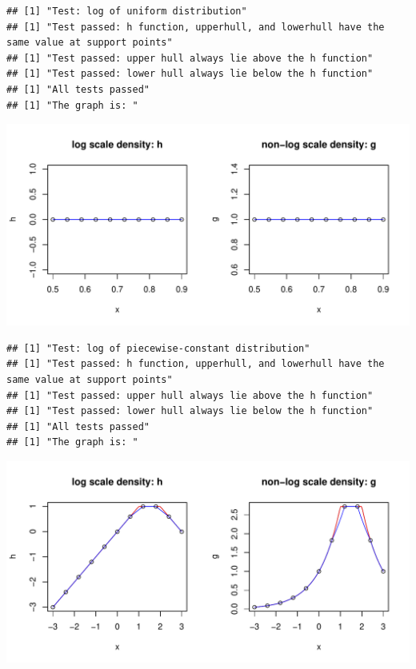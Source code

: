 \documentclass{article}\usepackage[]{graphicx}\usepackage[]{color}
\makeatletter
\def\maxwidth{ %
  \ifdim\Gin@nat@width>\linewidth
    \linewidth
  \else
    \Gin@nat@width
  \fi
}
\newenvironment{kframe}{%
 \def\at@end@of@kframe{}%
 \ifinner\ifhmode%
  \def\at@end@of@kframe{\end{minipage}}%
  \begin{minipage}{\columnwidth}%
 \fi\fi%
 \def\FrameCommand##1{\hskip\@totalleftmargin \hskip-\fboxsep
 \colorbox{shadecolor}{##1}\hskip-\fboxsep
     \hskip-\linewidth \hskip-\@totalleftmargin \hskip\columnwidth}%
 \MakeFramed {\advance\hsize-\width
   \@totalleftmargin\z@ \linewidth\hsize
   \@setminipage}}%
 {\par\unskip\endMakeFramed%
 \at@end@of@kframe}
\newenvironment{knitrout}{}{} %
\makeatother
\begin{document}
\begin{knitrout}
\begin{kframe}\begin{verbatim}
## [1] "Test: log of uniform distribution"
## [1] "Test passed: h function, upperhull, and lowerhull have the same value at support points"
## [1] "Test passed: upper hull always lie above the h function"
## [1] "Test passed: lower hull always lie below the h function"
## [1] "All tests passed"
## [1] "The graph is: "
\end{verbatim}
\end{kframe}
\includegraphics[width=\maxwidth]{figure/unnamed-chunk-1-3} 
\begin{kframe}\begin{verbatim}
## [1] "Test: log of piecewise-constant distribution"
## [1] "Test passed: h function, upperhull, and lowerhull have the same value at support points"
## [1] "Test passed: upper hull always lie above the h function"
## [1] "Test passed: lower hull always lie below the h function"
## [1] "All tests passed"
## [1] "The graph is: "
\end{verbatim}
\end{kframe}
\includegraphics[width=\maxwidth]{figure/unnamed-chunk-1-4} 

\end{knitrout}
\end{document}
